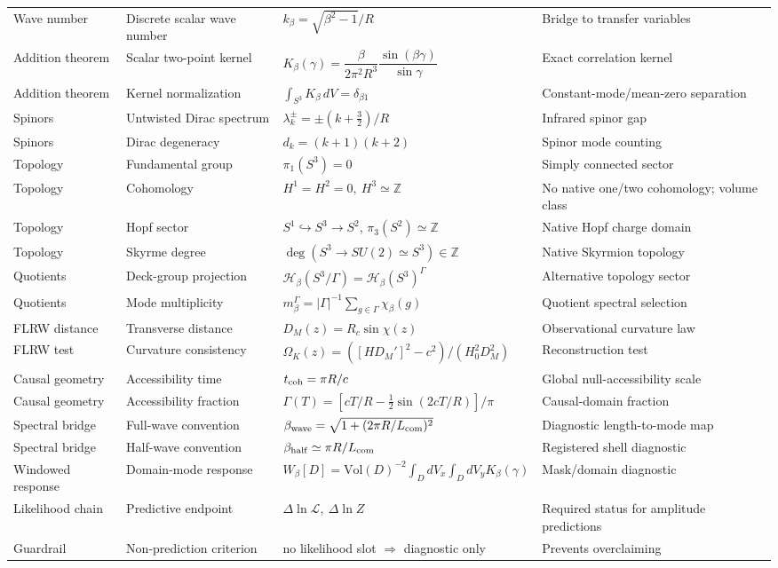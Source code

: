 \documentclass[aps,prd,onecolumn,superscriptaddress,longbibliography,nofootinbib,notitlepage]{revtex4-2}
\begin{document}
\begin{center}
{\begin{tabular}{llll}
Wave number & Discrete scalar wave number & $k_\beta=\sqrt{\beta^2-1}/R$ & Bridge to transfer variables \\
Addition theorem & Scalar two-point kernel & $K_\beta(\gamma)=\dfrac{\beta}{2\pi^2R^3}\dfrac{\sin(\beta\gamma)}{\sin\gamma}$ & Exact correlation kernel \\
Addition theorem & Kernel normalization & $\int_{S^3}K_\beta\,dV=\delta_{\beta1}$ & Constant-mode/mean-zero separation \\
Spinors & Untwisted Dirac spectrum & $\lambda_k^\pm=\pm(k+\tfrac32)/R$ & Infrared spinor gap \\
Spinors & Dirac degeneracy & $d_k=(k+1)(k+2)$ & Spinor mode counting \\
Topology & Fundamental group & $\pi_1(S^3)=0$ & Simply connected sector \\
Topology & Cohomology & $H^1=H^2=0,\ H^3\simeq\mathbb Z$ & No native one/two cohomology; volume class \\
Topology & Hopf sector & $S^1\hookrightarrow S^3\to S^2$, $\pi_3(S^2)\simeq\mathbb Z$ & Native Hopf charge domain \\
Topology & Skyrme degree & $\deg(S^3\to SU(2)\simeq S^3)\in\mathbb Z$ & Native Skyrmion topology \\
Quotients & Deck-group projection & $\mathcal H_\beta(S^3/\Gamma)=\mathcal H_\beta(S^3)^\Gamma$ & Alternative topology sector \\
Quotients & Mode multiplicity & $m_\beta^\Gamma=|\Gamma|^{-1}\sum_{g\in\Gamma}\chi_\beta(g)$ & Quotient spectral selection \\
FLRW distance & Transverse distance & $D_M(z)=R_c\sin\chi(z)$ & Observational curvature law \\
FLRW test & Curvature consistency & $\Omega_K(z)=([H D_M']^2-c^2)/(H_0^2D_M^2)$ & Reconstruction test \\
Causal geometry & Accessibility time & $t_{\rm coh}=\pi R/c$ & Global null-accessibility scale \\
Causal geometry & Accessibility fraction & $\Gamma(T)=[cT/R-\tfrac12\sin(2cT/R)]/\pi$ & Causal-domain fraction \\
Spectral bridge & Full-wave convention & $\beta_{\rm wave}=\sqrt{1+(2\pi R/L_{\rm com})^2}$ & Diagnostic length-to-mode map \\
Spectral bridge & Half-wave convention & $\beta_{\rm half}\simeq \pi R/L_{\rm com}$ & Registered shell diagnostic \\
Windowed response & Domain-mode response & $W_\beta[D]=\mathrm{Vol}(D)^{-2}\int_DdV_x\int_DdV_yK_\beta(\gamma)$ & Mask/domain diagnostic \\
Likelihood chain & Predictive endpoint & $\Delta\ln\mathcal L,\ \Delta\ln Z$ & Required status for amplitude predictions \\
Guardrail & Non-prediction criterion & no likelihood slot $\Rightarrow$ diagnostic only & Prevents overclaiming \\
\bottomrule
\end{tabular}%
}
\end{center}
\end{document}

